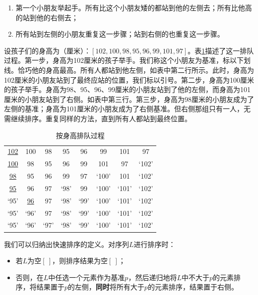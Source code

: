 \documentclass[b5paper]{ctexart}
\begin{document}
\begin{enumerate}
  \item 第一个小朋友举起手。所有比这个小朋友矮的都站到他的左侧去；所有比他高的站到他的右侧去；
  \item 所有站到左侧的小朋友重复这一步骤；站到右侧的也重复这一步骤。
\end{enumerate}

设孩子们的身高为（厘米）：$[102, 100, 98, 95, 96, 99, 101, 97]$。表\cref{tab:kids-sort}描述了这一排队过程。第一步，身高为102厘米的孩子举手。我们称这个小朋友为基准，标以下划线。恰巧他的身高最高。所有人都站到他左侧，如表中第二行所示。此时，身高为102厘米的小朋友站到了最终应站的位置，我们标以引号。第二步，身高为100厘米的孩子举手。身高为98、95、96、99厘米的小朋友站到了他的左侧，而身高为101厘米的小朋友站到了右侧。如表中第三行。第三步，身高为98厘米的小朋友成为了左侧的基准；身高为101厘米的小朋友成为了右侧基准。但右侧那组只有一人，无需继续排序。重复同样的方法，直到所有人都站到最终位置。

\begin{table}[htbp]
\centering
\begin{tabular}{ | c c c c c c c c |}
\hline
\underline{102} & 100 & 98 & 95 & 96 & 99 & 101 & 97 \\
\underline{100} & 98 & 95 & 96 & 99 & 101 & 97 & `102' \\
\underline{98} & 95 & 96 & 99 & 97 & `100' & 101 & `102' \\
\underline{95} & 96 & 97 & `98' & 99 & `100' & `101' & `102' \\
`95' & \underline{96} & 97 & `98' & `99' & `100' & `101' & `102' \\
`95' & `96' & 97 & `98' & `99' & `100' & `101' & `102' \\
`95' & `96' & `97' & `98' & `99' & `100' & `101' & `102' \\
\hline
\end{tabular}
\caption{按身高排队过程}
\label{tab:kids-sort}
\end{table}

我们可以归纳出快速排序的定义。对序列$L$进行排序时：

\begin{itemize}
\item 若$L$为空$[\ ]$，则排序结果为空$[\ ]$；
\item 否则，在$L$中任选一个元素作为基准$p$，然后递归地将$L$中不大于$p$的元素排序，将结果置于$p$的左侧，\textbf{同时}将所有大于$p$的元素排序，结果置于右侧。
\end{itemize}
\end{document}
